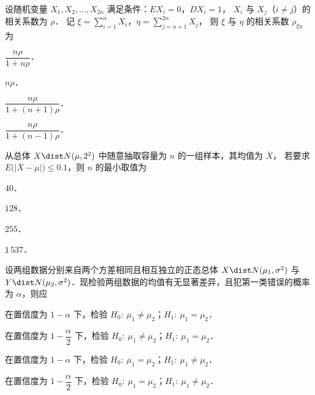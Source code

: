 \begin{question}[index=8]
设随机变量 $X_1,X_2,\ldots,X_{2n}$ 满足条件：$EX_i=0$，$DX_i=1$，
$X_i$ 与 $X_j$（$i\ne j$）的相关系数为 $\rho$．
记 $\displaystyle\xi=\sum_{i=1}^{n}X_i$，$\displaystyle\eta=\sum_{j=n+1}^{2n}X_j$，
则 $\xi$ 与 $\eta$ 的相关系数 $\rho_{\xi\eta}$ 为
\begin{choices}[columns=4,label-pos=left]
\item $\dfrac{n\rho}{1+n\rho}$．
\item $n\rho$．
\item $\dfrac{n\rho}{1+(n+1)\rho}$．
\item $\dfrac{n\rho}{1+(n-1)\rho}$．
\end{choices}
\end{question}
\QuestionBreak

\begin{question}[index=9]
从总体 $X\dist N(\mu,2^2)$ 中随意抽取容量为 $n$ 的一组样本，其均值为 $\overline X$，
若要求 $E\bigl(\lvert\overline X-\mu\rvert\bigr)\le0.1$，则 $n$ 的最小取值为
\begin{choices}[columns=2]
\item $40$．
\item $128$．
\item $255$．
\item $1\,537$．
\end{choices}
\end{question}
\QuestionBreak

\begin{question}[index=10]
设两组数据分别来自两个方差相同且相互独立的正态总体 $X\dist N(\mu_1,\sigma^2)$
与 $Y\dist N(\mu_2,\sigma^2)$．现检验两组数据的均值有无显著差异，且犯第一类错误的概率为 $\alpha$，则应
\begin{choices}[columns=1]
\item 在置信度为 $1-\alpha$ 下，检验 $H_0:\ \mu_1\ne\mu_2$；$H_1:\ \mu_1=\mu_2$．
\item 在置信度为 $1-\dfrac{\alpha}{2}$ 下，检验 $H_0:\ \mu_1\ne\mu_2$；$H_1:\ \mu_1=\mu_2$．
\item 在置信度为 $1-\alpha$ 下，检验 $H_0:\ \mu_1=\mu_2$；$H_1:\ \mu_1\ne\mu_2$．
\item 在置信度为 $1-\dfrac{\alpha}{2}$ 下，检验 $H_0:\ \mu_1=\mu_2$；$H_1:\ \mu_1\ne\mu_2$．
\end{choices}
\end{question}
